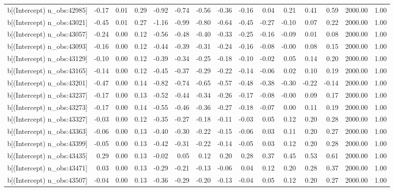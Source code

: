 \begin{table}[ht]
\begin{tabular}{rrrrrrrrrrrrrrr}
  b[(Intercept) n\_obs:42985] & -0.17 & 0.01 & 0.29 & -0.92 & -0.74 & -0.56 & -0.36 & -0.16 & 0.04 & 0.21 & 0.41 & 0.59 & 2000.00 & 1.00 \\ 
  b[(Intercept) n\_obs:43021] & -0.45 & 0.01 & 0.27 & -1.16 & -0.99 & -0.80 & -0.64 & -0.45 & -0.27 & -0.10 & 0.07 & 0.22 & 2000.00 & 1.00 \\ 
  b[(Intercept) n\_obs:43057] & -0.24 & 0.00 & 0.12 & -0.56 & -0.48 & -0.40 & -0.33 & -0.25 & -0.16 & -0.09 & 0.01 & 0.08 & 2000.00 & 1.00 \\ 
  b[(Intercept) n\_obs:43093] & -0.16 & 0.00 & 0.12 & -0.44 & -0.39 & -0.31 & -0.24 & -0.16 & -0.08 & -0.00 & 0.08 & 0.15 & 2000.00 & 1.00 \\ 
  b[(Intercept) n\_obs:43129] & -0.10 & 0.00 & 0.12 & -0.39 & -0.34 & -0.25 & -0.18 & -0.10 & -0.02 & 0.05 & 0.14 & 0.20 & 2000.00 & 1.00 \\ 
  b[(Intercept) n\_obs:43165] & -0.14 & 0.00 & 0.12 & -0.45 & -0.37 & -0.29 & -0.22 & -0.14 & -0.06 & 0.02 & 0.10 & 0.19 & 2000.00 & 1.00 \\ 
  b[(Intercept) n\_obs:43201] & -0.47 & 0.00 & 0.14 & -0.82 & -0.74 & -0.65 & -0.57 & -0.48 & -0.38 & -0.30 & -0.22 & -0.14 & 2000.00 & 1.00 \\ 
  b[(Intercept) n\_obs:43237] & -0.17 & 0.00 & 0.13 & -0.52 & -0.44 & -0.34 & -0.26 & -0.17 & -0.08 & -0.00 & 0.09 & 0.17 & 2000.00 & 1.00 \\ 
  b[(Intercept) n\_obs:43273] & -0.17 & 0.00 & 0.14 & -0.55 & -0.46 & -0.36 & -0.27 & -0.18 & -0.07 & 0.00 & 0.11 & 0.19 & 2000.00 & 1.00 \\ 
  b[(Intercept) n\_obs:43327] & -0.03 & 0.00 & 0.12 & -0.35 & -0.27 & -0.18 & -0.11 & -0.03 & 0.05 & 0.12 & 0.20 & 0.28 & 2000.00 & 1.00 \\ 
  b[(Intercept) n\_obs:43363] & -0.06 & 0.00 & 0.13 & -0.40 & -0.30 & -0.22 & -0.15 & -0.06 & 0.03 & 0.11 & 0.20 & 0.27 & 2000.00 & 1.00 \\ 
  b[(Intercept) n\_obs:43399] & -0.05 & 0.00 & 0.13 & -0.42 & -0.31 & -0.22 & -0.14 & -0.05 & 0.03 & 0.12 & 0.20 & 0.28 & 2000.00 & 1.00 \\ 
  b[(Intercept) n\_obs:43435] & 0.29 & 0.00 & 0.13 & -0.02 & 0.05 & 0.12 & 0.20 & 0.28 & 0.37 & 0.45 & 0.53 & 0.61 & 2000.00 & 1.00 \\ 
  b[(Intercept) n\_obs:43471] & 0.03 & 0.00 & 0.13 & -0.29 & -0.21 & -0.13 & -0.06 & 0.04 & 0.12 & 0.20 & 0.28 & 0.37 & 2000.00 & 1.00 \\ 
  b[(Intercept) n\_obs:43507] & -0.04 & 0.00 & 0.13 & -0.36 & -0.29 & -0.20 & -0.13 & -0.04 & 0.05 & 0.12 & 0.20 & 0.27 & 2000.00 & 1.00 \\ 

\end{tabular}
\end{table}
